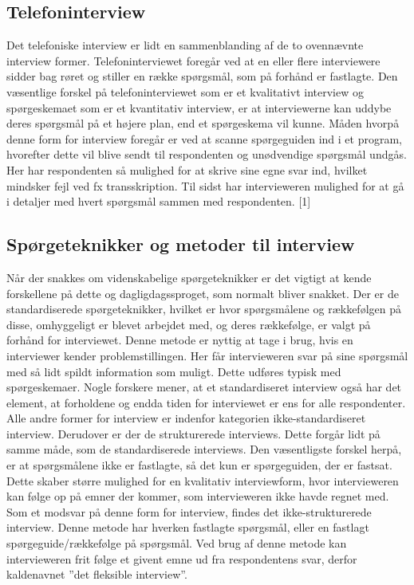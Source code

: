 \subsection{Telefoninterview}
Det telefoniske interview er lidt en sammenblanding af de to ovennævnte interview former. Telefoninterviewet foregår ved at en eller flere interviewere sidder bag røret og stiller en række spørgsmål, som på forhånd er fastlagte. Den væsentlige forskel på telefoninterviewet som er et kvalitativt interview og spørgeskemaet som er et kvantitativ interview, er at interviewerne kan uddybe deres spørgsmål på et højere plan, end et spørgeskema vil kunne. Måden hvorpå denne form for interview foregår er ved at scanne spørgeguiden ind i et program, hvorefter dette vil blive sendt til respondenten og unødvendige spørgsmål undgås. Her har respondenten så mulighed for at skrive sine egne svar ind, hvilket mindsker fejl ved fx transskription. Til sidst har intervieweren mulighed for at gå i detaljer med hvert spørgsmål sammen med respondenten. [1]


\subsection{Spørgeteknikker og metoder til interview}
Når der snakkes om videnskabelige spørgeteknikker er det vigtigt at kende forskellene på dette og dagligdagssproget, som normalt bliver snakket. Der er de standardiserede spørgeteknikker, hvilket er hvor spørgsmålene og rækkefølgen på disse, omhyggeligt er blevet arbejdet med, og deres rækkefølge, er valgt på forhånd for interviewet. Denne metode er nyttig at tage i brug, hvis en interviewer kender problemstillingen. Her får intervieweren svar på sine spørgsmål med så lidt spildt information som muligt. Dette udføres typisk med spørgeskemaer. Nogle forskere mener, at et standardiseret interview også har det element, at forholdene og endda tiden for interviewet er ens for alle respondenter. Alle andre former for interview er indenfor kategorien ikke-standardiseret interview.
Derudover er der de strukturerede interviews. Dette forgår lidt på samme måde, som de standardiserede interviews. Den væsentligste forskel herpå, er at spørgsmålene ikke er fastlagte, så det kun er spørgeguiden, der er fastsat. Dette skaber større mulighed for en kvalitativ interviewform, hvor intervieweren kan følge op på emner der kommer, som intervieweren ikke havde regnet med. Som et modsvar på denne form for interview, findes det ikke-strukturerede interview. Denne metode har hverken fastlagte spørgsmål, eller en fastlagt spørgeguide/rækkefølge på spørgsmål. Ved brug af denne metode kan intervieweren frit følge et givent emne ud fra respondentens svar, derfor kaldenavnet  ”det fleksible interview”. 

